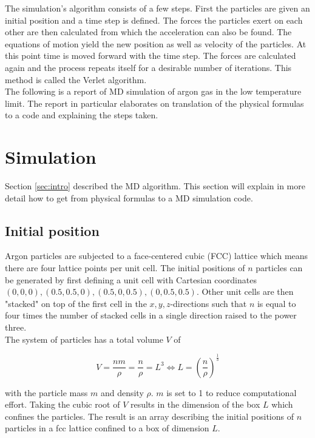 \documentclass[10pt,a4paper,notitlepage]{article}
\begin{document}
The simulation's algorithm consists of a few steps. First the particles are given an initial position and a time step is defined. The forces the particles exert on each other are then calculated from which the acceleration can also be found. The equations of motion yield the new position as well as velocity of the particles. At this point time is moved forward with the time step. The forces are calculated again and the process repeats itself for a desirable number of iterations. This method is called the Verlet algorithm.\\

The following is a report of MD simulation of argon gas in the low temperature limit. The report in particular elaborates on translation of the physical formulas to a code and explaining the steps taken.

\section{Simulation}\label{sec:sim}
Section \ref{sec:intro} described the MD algorithm. This section will explain in more detail how to get from physical formulas to a MD simulation code.
\subsection{Initial position}\label{sec:init_pos}
Argon particles are subjected to a face-centered cubic (FCC) lattice which means there are four lattice points per unit cell. The initial positions of $n$ particles can be generated by first defining a unit cell with Cartesian coordinates $(0,0,0),(0.5,0.5,0),(0.5,0,0.5),(0,0.5,0.5)$. Other unit cells are then "stacked" on top of the first cell in the $x,y,z$-directions such that $n$ is equal to four times the number of stacked cells in a single direction raised to the power three.\\
The system of particles has a total volume $V$ of 

\begin{equation*}
V = \frac{nm}{\rho} = \frac{n}{\rho} = L^3 \Leftrightarrow L = \left(\frac{n}{\rho}\right)^{\frac{1}{3}}
\end{equation*}

with the particle mass $m$ and density $\rho$. $m$ is set to 1 to reduce computational effort. Taking the cubic root of $V$ results in the dimension of the box $L$ which confines the particles. The result is an array describing the initial positions of $n$ particles in a fcc lattice confined to a box of dimension $L$.
\end{document}
